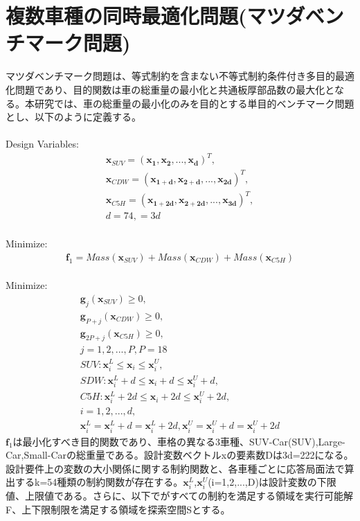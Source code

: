 \documentclass[twocolumn,10pt]{jarticle}
\begin{document}
\section{複数車種の同時最適化問題(マツダベンチマーク問題)}
マツダベンチマーク問題は、等式制約を含まない不等式制約条件付き多目的最適化問題であり、目的関数は車の総重量の最小化と共通板厚部品数の最大化となる。本研究では、車の総重量の最小化のみを目的とする単目的ベンチマーク問題とし、以下のように定義する。\\
\\
{\large{Design Variables:}}
\begin{eqnarray}
\bm{x}_{SUV}=\bm{(\bm{x}_1,\bm{x}_2,...,\bm{x}_d)}^T,\\
\bm{x}_{CDW}=\bm{(\bm{x}_{1+d},\bm{x}_{2+d},...,\bm{x}_{2d})}^T,\\
\bm{x}_{C5H}=\bm{(\bm{x}_{1+2d},\bm{x}_{2+2d},...,\bm{x}_{3d})}^T,\\
d=74,=3d\nonumber
\end{eqnarray}
\\
{\large{Minimize:}}
\begin{eqnarray}
\bm{f}_1=Mass(\bm{x}_{SUV})+Mass(\bm{x}_{CDW})+Mass(\bm{x}_{C5H})
\end{eqnarray}
\\
{\large{Minimize:}}
\begin{eqnarray}
\bm{g}_j(\bm{x}_{SUV})\geq0,\\
\bm{g}_{P+j}(\bm{x}_{CDW})\geq0,\\
\bm{g}_{2P+j}(\bm{x}_{C5H})\geq0,\\
j=1,2,...,P,P=18\nonumber\\
SUV:\bm{x}^L_i\leq \bm{x}_i\leq \bm{x}^U_i,\\
SDW:\bm{x}^L_i+d\leq \bm{x}_i+d\leq \bm{x}^U_i+d,\\
C5H:\bm{x}^L_i+2d\leq \bm{x}_i+2d\leq \bm{x}^U_i+2d,\\
i=1,2,...,d,\nonumber\\
\bm{x}^L_i=\bm{x}^L_i+d=\bm{x}^L_i+2d,\bm{x}^U_i=\bm{x}^U_i+d=\bm{x}^U_i+2d
\end{eqnarray}
$\bm{f}_1$は最小化すべき目的関数であり、車格の異なる3車種、SUV-Car(SUV),Large-Car,Small-Carの総重量である。設計変数ベクトルxの要素数Dは3d=222になる。設計要件上の変数の大小関係に関する制約関数と、各車種ごとに応答局面法で算出するk=54種類の制約関数が存在する。$\bm{x}^L_i$,$\bm{x}^U_i$(i=1,2,...,D)は設計変数の下限値、上限値である。さらに、以下でがすべての制約を満足する領域を実行可能解F、上下限制限を満足する領域を探索空間Sとする。
\end{document}
